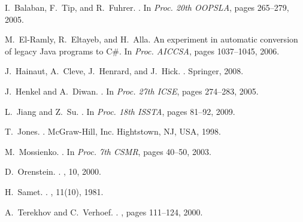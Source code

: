 \documentclass{sig-alternate}
\begin{document}









%


\begin{scriptsize}
\begin{thebibliography}{10}

I.~Balaban, F.~Tip, and R.~Fuhrer.
.
\newblock In {\em Proc. 20th OOPSLA}, pages 265--279, 2005.

M.~El-Ramly, R.~Eltayeb, and H.~Alla.
\newblock An experiment in automatic conversion of legacy {Java} programs to
  {C\#}.
\newblock In {\em Proc. AICCSA}, pages 1037--1045, 2006.

J.~Hainaut, A.~Cleve, J.~Henrard, and J.~Hick.
.
\newblock Springer, 2008.

J.~Henkel and A.~Diwan.
.
\newblock In {\em Proc. 27th ICSE}, pages 274--283, 2005.

L.~Jiang and Z.~Su.
.
\newblock In {\em Proc. 18th ISSTA}, pages 81--92, 2009.

T.~Jones.
.
\newblock McGraw-Hill, Inc. Hightstown, NJ, USA, 1998.

M.~Mossienko.
.
\newblock In {\em Proc. 7th CSMR}, pages 40--50, 2003.

D.~Orenstein.
.
, 10, 2000.

H.~Samet.
.
, 11(10), 1981.

A.~Terekhov and C.~Verhoef.
.
, pages 111--124, 2000.


\end{thebibliography}
\end{scriptsize}
\end{document}
